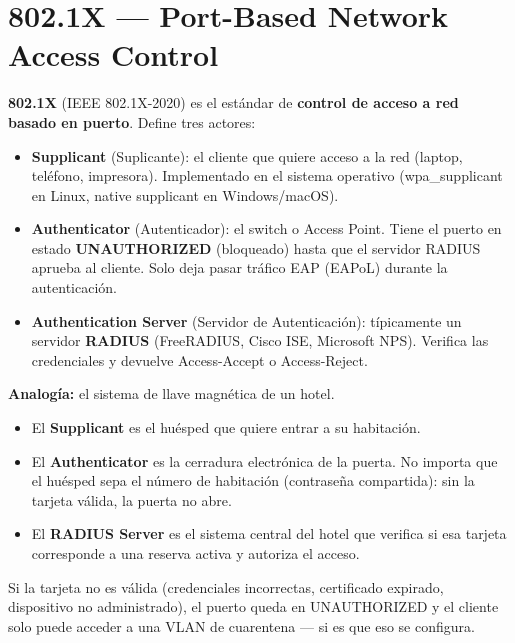 \section{ 802.1X --- Port-Based Network Access Control}

\begin{concepto}
\textbf{802.1X} (IEEE 802.1X-2020) es el estándar de \textbf{control de acceso
a red basado en puerto}. Define tres actores:

\begin{itemize}
    \item \textbf{Supplicant} (Suplicante): el cliente que quiere acceso a la red
          (laptop, teléfono, impresora). Implementado en el sistema operativo
          (wpa\_supplicant en Linux, native supplicant en Windows/macOS).
    \item \textbf{Authenticator} (Autenticador): el switch o Access Point.
          Tiene el puerto en estado \textbf{UNAUTHORIZED} (bloqueado) hasta que
          el servidor RADIUS aprueba al cliente. Solo deja pasar tráfico EAP
          (EAPoL) durante la autenticación.
    \item \textbf{Authentication Server} (Servidor de Autenticación): típicamente
          un servidor \textbf{RADIUS} (FreeRADIUS, Cisco ISE, Microsoft NPS).
          Verifica las credenciales y devuelve Access-Accept o Access-Reject.
\end{itemize}

 \textbf{Analogía:} el sistema de llave magnética de un hotel.
\begin{itemize}
    \item El \textbf{Supplicant} es el huésped que quiere entrar a su habitación.
    \item El \textbf{Authenticator} es la cerradura electrónica de la puerta.
          No importa que el huésped sepa el número de habitación (contraseña
          compartida): sin la tarjeta válida, la puerta no abre.
    \item El \textbf{RADIUS Server} es el sistema central del hotel que verifica
          si esa tarjeta corresponde a una reserva activa y autoriza el acceso.
\end{itemize}

Si la tarjeta no es válida (credenciales incorrectas, certificado expirado,
dispositivo no administrado), el puerto queda en UNAUTHORIZED y el cliente
solo puede acceder a una VLAN de cuarentena --- si es que eso se configura.
\end{concepto}

